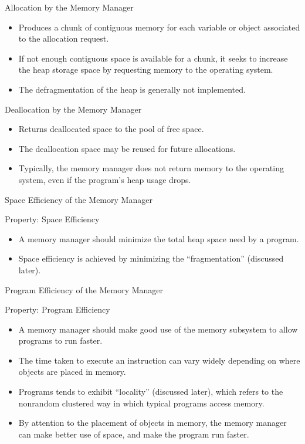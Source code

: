\begin{bibunit}[apalike]
\begin{frame}{Allocation by the Memory Manager}
	\begin{itemize}
	\item Produces a chunk of contiguous memory for each variable or object associated to the allocation request.
	\vfill
	\item If not enough contiguous space is available for a chunk, it seeks to increase the heap storage space by requesting memory to the operating system.
	\vfill
	\item The defragmentation of the heap is generally not implemented.
	\end{itemize}
\end{frame}

\begin{frame}{Deallocation by the Memory Manager}
	\begin{itemize}
	\item Returns deallocated space to the pool of free space.
	\vfill
	\item The deallocation space may be reused for future allocations.
	\vfill
	\item Typically, the memory manager does not return memory to the operating system, even if the program's heap usage drops.
	\end{itemize}
\end{frame}

\begin{frame}{Space Efficiency of the Memory Manager}
	\begin{block}{Property: Space Efficiency}
		\begin{itemize}
		\item A memory manager should minimize the total heap space need by a program.
		\item Space efficiency is achieved by minimizing the ``fragmentation'' (discussed later).
		\end{itemize}
	\end{block}
\end{frame}

\begin{frame}{Program Efficiency of the Memory Manager}
	\begin{block}{Property: Program Efficiency}
		\begin{itemize}
		\item A memory manager should make good use of the memory subsystem to allow programs to run faster.
		\item The time taken to execute an instruction can vary widely depending on where objects are placed in memory.
		\item Programs tends to exhibit ``locality'' (discussed later), which refers to the nonrandom clustered way in which typical programs access memory.
		\item By attention to the placement of objects in memory, the memory manager can make better use of space, and make the program run faster.
		\end{itemize}
	\end{block}
\end{frame}


\end{bibunit}
